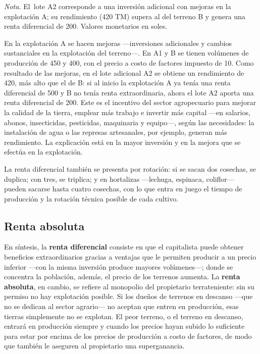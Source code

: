 \documentclass[
  man,
  floatsintext,
  longtable,
  a4paper,
  nolmodern,
  notxfonts,
  notimes,
  12pt,
  colorlinks=true,linkcolor=blue,citecolor=blue,urlcolor=blue]{apa7}
\begin{document}
\begin{table}
\vspace{-20pt}
\noindent \emph{Nota.} El~lote A2 corresponde a una inversión adicional
con mejoras en la explotación A; su rendimiento (420 TM) supera al del
terreno B y genera una renta diferencial de 200. Valores monetarios en
soles.

\end{table}

En la explotación A se hacen mejoras ---inversiones adicionales y
cambios sustanciales en la explotación del terreno---. En A1 y B se
tienen volúmenes de producción de 450 y 400, con el precio a costo de
factores impuesto de 10. Como resultado de las mejoras, en el lote
adicional A2 se obtiene un rendimiento de 420, más alto que el de B: si
al inicio la explotación A ya tenía una renta diferencial de 500 y B no
tenía renta extraordinaria, ahora el lote A2 aporta una renta
diferencial de 200. Este es el incentivo del sector agropecuario para
mejorar la calidad de la tierra, emplear más trabajo e invertir más
capital ---en salarios, abonos, insecticidas, pesticidas, maquinaria y
equipo---, según las necesidades: la instalación de agua o las represas
artesanales, por ejemplo, generan más rendimiento. La explicación está
en la mayor inversión y en la mejora que se efectúa en la explotación.

La renta diferencial también se presenta por rotación: si se sacan dos
cosechas, se duplica; con tres, se triplica; y en hortalizas ---lechuga,
espinaca, coliflor--- pueden sacarse hasta cuatro cosechas, con lo que
entra en juego el tiempo de producción y la rotación técnica posible de
cada cultivo.

\subsection{Renta absoluta}\label{renta-absoluta}

En síntesis, la \textbf{renta diferencial} consiste en que el
capitalista puede obtener beneficios extraordinarios gracias a ventajas
que le permiten producir a un precio inferior ---con la misma inversión
produce mayores volúmenes---; donde se concentra la población, además,
el precio de los terrenos aumenta. La \textbf{renta absoluta}, en
cambio, se refiere al monopolio del propietario terrateniente: sin su
permiso no hay explotación posible. Si los dueños de terrenos en
descanso ---que no se dedican al sector agrario--- no aceptan que entren
en producción, esas tierras simplemente no se explotan. El peor terreno,
o el terreno en descanso, entrará en producción siempre y cuando los
precios hayan subido lo suficiente para estar por encima de los precios
de producción a costo de factores, de modo que también le aseguren al
propietario una superganancia.
\end{document}
